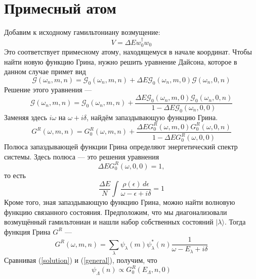 \documentclass{article}
\begin{document}
\section{Примесный атом}
Добавим к исходному гамильтониану возмущение:
\begin{equation}
	V = \Delta E w_0^{\dagger} w_0
\end{equation}
Это соответствует примесному атому, находящемуся в начале координат.
Чтобы найти новую функцию Грина, нужно решить уравнение Дайсона, которое в данном случае
примет вид
\begin{equation}
	\mathcal{G}(\omega_n,m,n) = 
		\mathcal{G}_0(\omega_n, m,n) + 
		\Delta E \mathcal{G}_0(\omega_n, m,0)\mathcal{G}(\omega_n, 0,n)
\end{equation}
Решение этого уравнения --- 
\begin{equation}
	\mathcal{G}(\omega_n, m,n) = \mathcal{G}_0(\omega_n, m,n) + 
		\frac{\Delta E\mathcal{G}_0(\omega_n, m,0)\mathcal{G}_0(\omega_n, 0, n)}{1 - \Delta E \mathcal{G}_0(\omega_n,0,0)}
\end{equation}
Заменяя здесь $i\omega$ на $\omega + i\delta$, найдём запаздывающую функцию Грина.
\begin{equation}
	\label{solution}
	G^R(\omega, m,n) = G^R_0(\omega, m,n) + 
		\frac{\Delta EG^R_0(\omega, m,0)G^R_0(\omega, 0, n)}{1 - \Delta E G^R_0(\omega,0,0)}
\end{equation}
Полюса запаздывающей функции Грина определяют энергетический спектр системы. Здесь полюса ---
это решения уравнения
\begin{equation}
	\Delta E G^R_0(\omega, 0,0) = 1,
\end{equation}
то есть 
\begin{equation}
	 \frac{\Delta E}{N}\int  \frac{\rho(\epsilon)\,d\epsilon}{\omega - \epsilon + i\delta}= 1
\end{equation}
Кроме того, зная запаздывающую функцию Грина, можно найти волновую функцию связанного
состояния. Предположим, что мы диагонализовали возмущённый гамильтониан и нашли
набор собственных состояний $|\lambda\rangle$. Тогда функция Грина $G^R$ --- 
\begin{equation}
	\label{general}
	G^R(\omega, m,n) = \sum_\lambda \psi_\lambda(m)\psi_\lambda^{*}(n) 
			\frac{1}{\omega - E_\lambda + i\delta}
\end{equation}
Сравнивая (\ref{solution}) и (\ref{general}), получим, что
\begin{equation}
	\psi_\Lambda(n) \propto G_0^{R}(E_\Lambda, n,0)
\end{equation}
\end{document}
